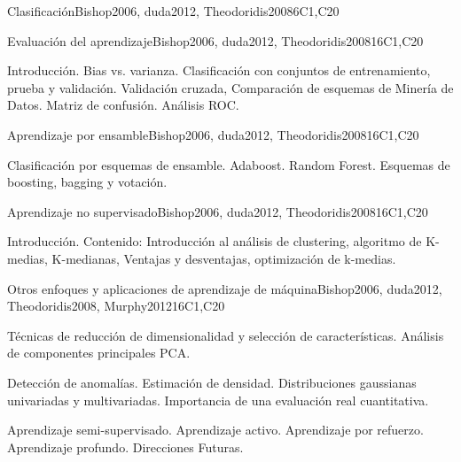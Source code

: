 \begin{syllabus}
\begin{unit}{Clasificación}{}{Bishop2006, duda2012, Theodoridis2008}{6}{C1,C20}
\begin{topics}
\end{topics}

\end{unit}

\begin{unit}{Evaluación del aprendizaje}{}{Bishop2006, duda2012, Theodoridis2008}{16}{C1,C20}
\begin{topics}
      \item Introducción. Bias vs. varianza. Clasificación con conjuntos de entrenamiento, prueba y validación. Validación cruzada, Comparación de esquemas de Minería de Datos. Matriz de confusión. Análisis ROC.
   \end{topics}

\end{unit}

\begin{unit}{Aprendizaje por ensamble}{}{Bishop2006, duda2012, Theodoridis2008}{16}{C1,C20}
\begin{topics}
      \item Clasificación por esquemas de ensamble. Adaboost. Random Forest. Esquemas de boosting, bagging y votación.
   \end{topics}

\end{unit}

\begin{unit}{Aprendizaje no supervisado}{}{Bishop2006, duda2012, Theodoridis2008}{16}{C1,C20}
\begin{topics}
      \item Introducción. Contenido: Introducción al análisis de clustering, algoritmo de K-medias, K-medianas, Ventajas y desventajas, optimización de k-medias.
   \end{topics}

\end{unit}

\begin{unit}{Otros enfoques y aplicaciones de aprendizaje de máquina}{}{Bishop2006, duda2012, Theodoridis2008, Murphy2012}{16}{C1,C20}
\begin{topics}
      \item Técnicas de reducción de dimensionalidad y selección de características. Análisis de componentes principales PCA.
      \item Detección de anomalías. Estimación de densidad. Distribuciones gaussianas univariadas y multivariadas. Importancia de una evaluación real cuantitativa.
      \item Aprendizaje semi-supervisado. Aprendizaje activo. Aprendizaje por refuerzo. Aprendizaje profundo. Direcciones Futuras.
   \end{topics}
\end{unit}



\begin{coursebibliography}
\end{coursebibliography}

\end{syllabus}
